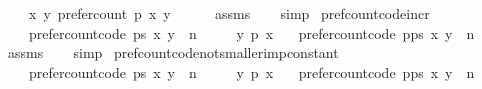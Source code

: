 \begin{isabellebody}
\ \ \ {\isachardoublequoteopen}{\isasymforall}\ x\ y{\isachardot}{\kern0pt}\ prefer{\isacharunderscore}{\kern0pt}count\ p\ x\ y\ {\isacharequal}{\kern0pt}\ {}{\isachardoublequoteclose}\isanewline
%
\isadelimproof
\ \ %
\endisadelimproof
%
\isatagproof
{}\isamarkupfalse%
\ assms\isanewline
\ \ \isamarkupfalse%
\ simp%
\endisatagproof
{\isafoldproof}%
%
\isadelimproof
\isanewline
%
\endisadelimproof
\isanewline
{}\isamarkupfalse%
\ pref{\isacharunderscore}{\kern0pt}count{\isacharunderscore}{\kern0pt}code{\isacharunderscore}{\kern0pt}incr{\isacharcolon}{\kern0pt}\isanewline
\ \ \isanewline
\ \ \ \ {\isachardoublequoteopen}prefer{\isacharunderscore}{\kern0pt}count{\isacharunderscore}{\kern0pt}code\ ps\ x\ y\ {\isacharequal}{\kern0pt}\ n{\isachardoublequoteclose}\ \isanewline
\ \ \ \ {\isachardoublequoteopen}y\ {\isasympreceq}\isactrlsub p\ x{\isachardoublequoteclose}\isanewline
\ \ \ {\isachardoublequoteopen}prefer{\isacharunderscore}{\kern0pt}count{\isacharunderscore}{\kern0pt}code\ {\isacharparenleft}{\kern0pt}p{\isacharhash}{\kern0pt}ps{\isacharparenright}{\kern0pt}\ x\ y\ {\isacharequal}{\kern0pt}\ n{\isacharplus}{\kern0pt}{}{\isachardoublequoteclose}\isanewline
%
\isadelimproof
\ \ %
\endisadelimproof
%
\isatagproof
{}\isamarkupfalse%
\ assms\isanewline
\ \ \isamarkupfalse%
\ simp%
\endisatagproof
{\isafoldproof}%
%
\isadelimproof
\isanewline
%
\endisadelimproof
\isanewline
{}\isamarkupfalse%
\ pref{\isacharunderscore}{\kern0pt}count{\isacharunderscore}{\kern0pt}code{\isacharunderscore}{\kern0pt}not{\isacharunderscore}{\kern0pt}smaller{\isacharunderscore}{\kern0pt}imp{\isacharunderscore}{\kern0pt}constant{\isacharcolon}{\kern0pt}\isanewline
\ \ \isanewline
\ \ \ \ {\isachardoublequoteopen}prefer{\isacharunderscore}{\kern0pt}count{\isacharunderscore}{\kern0pt}code\ ps\ x\ y\ {\isacharequal}{\kern0pt}\ n{\isachardoublequoteclose}\ \isanewline
\ \ \ \ {\isachardoublequoteopen}{\isasymnot}{\isacharparenleft}{\kern0pt}y\ {\isasympreceq}\isactrlsub p\ x{\isacharparenright}{\kern0pt}{\isachardoublequoteclose}\isanewline
\ \ \ {\isachardoublequoteopen}prefer{\isacharunderscore}{\kern0pt}count{\isacharunderscore}{\kern0pt}code\ {\isacharparenleft}{\kern0pt}p{\isacharhash}{\kern0pt}ps{\isacharparenright}{\kern0pt}\ x\ y\ {\isacharequal}{\kern0pt}\ n{\isachardoublequoteclose}\isanewline
%
\isadelimproof
\ \ %
\endisadelimproof

\end{isabellebody}
